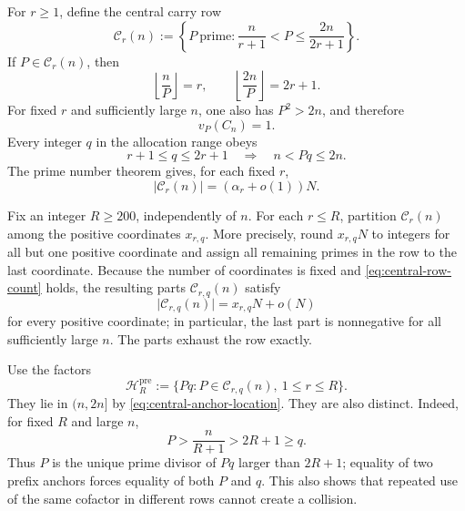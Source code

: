 \documentclass[11pt]{article}
\numberwithin{equation}{section}
\theoremstyle{definition}
\theoremstyle{remark}
\newcommand{\1}{\mathbf 1}
\begin{document}
For \(r\ge1\), define the central carry row
\begin{equation}
 \mathcal C_r(n):=
 \left\{P\ \text{prime}:
      \frac{n}{r+1}<P\le\frac{2n}{2r+1}\right\}.
 \label{eq:central-carry-row}
\end{equation}
If \(P\in\mathcal C_r(n)\), then
\[
 \left\lfloor\frac nP\right\rfloor=r,
 \qquad
 \left\lfloor\frac{2n}{P}\right\rfloor=2r+1.
\]
For fixed \(r\) and sufficiently large \(n\), one also has \(P^2>2n\),
and therefore
\begin{equation}
                    v_P(C_n)=1.
                    \label{eq:central-row-valuation}
\end{equation}
Every integer \(q\) in the allocation range obeys
\begin{equation}
       r+1\le q\le2r+1
       \quad\Longrightarrow\quad
       n<Pq\le2n.
 \label{eq:central-anchor-location}
\end{equation}
The prime number theorem gives, for each fixed \(r\),
\begin{equation}
       \lvert\mathcal C_r(n)\rvert
       =(\alpha_r+o(1))N.
       \label{eq:central-row-count}
\end{equation}

Fix an integer \(R\ge200\), independently of \(n\).  For each \(r\le R\),
partition \(\mathcal C_r(n)\) among the positive coordinates
\(x_{r,q}\).  More precisely, round
\(x_{r,q}N\) to integers for all but one positive coordinate and assign
all remaining primes in the row to the last coordinate.  Because the
number of coordinates is fixed and \eqref{eq:central-row-count} holds,
the resulting parts \(\mathcal C_{r,q}(n)\) satisfy
\begin{equation}
 \lvert\mathcal C_{r,q}(n)\rvert=x_{r,q}N+o(N)
 \label{eq:integer-prefix-parts}
\end{equation}
for every positive coordinate; in particular, the last part is
nonnegative for all sufficiently large \(n\).  The parts exhaust the row
exactly.

Use the factors
\begin{equation}
 \mathcal H_R^{\mathrm{pre}}
 :=\{Pq:P\in\mathcal C_{r,q}(n),\ 1\le r\le R\}.
 \label{eq:prefix-anchor-set}
\end{equation}
They lie in \((n,2n]\) by \eqref{eq:central-anchor-location}.  They are
also distinct.  Indeed, for fixed \(R\) and large \(n\),
\[
        P>\frac{n}{R+1}>2R+1\ge q.
\]
Thus \(P\) is the unique prime divisor of \(Pq\) larger than \(2R+1\);
equality of two prefix anchors forces equality of both \(P\) and \(q\).
This also shows that repeated use of the same cofactor in different rows
cannot create a collision.
\end{document}

